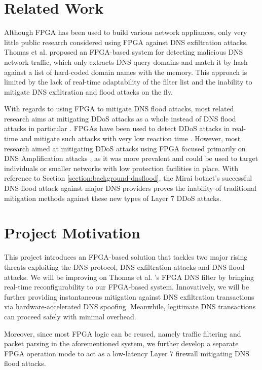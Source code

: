 \documentclass[a4paper]{report}
\begin{document}
\section{Related Work}

Although FPGA has been used to build various network appliances, only very little public research considered using FPGA against DNS exfiltration attacks. Thomas et al. \cite{thomas-2011} proposed an FPGA-based system for detecting malicious DNS network traffic, which only extracts DNS query domains and match it by hash against a list of hard-coded domain names with the memory. This approach is limited by the lack of real-time adaptability of the filter list and the inability to mitigate DNS exfiltration and flood attacks on the fly. 

With regards to using FPGA to mitigate DNS flood attacks, most related research aims at mitigating DDoS attacks as a whole instead of DNS flood attacks in particular \cite{hoque-2017, nagy-2018, tokusashi-2016, thinh-2016}. FPGAs have been used to detect DDoS attacks in real-time \cite{hoque-2017} and mitigate such attacks with very low reaction time \cite{nagy-2018}. However, most research aimed at mitigating DDoS attacks using FPGA focused primarily on DNS Amplification attacks \cite{nagy-2018, thinh-2016, tokusashi-2016}, as it was more prevalent and could be used to target individuals or smaller networks with low protection facilities in place. With reference to Section \ref{section:background-dnsflood}, the Mirai botnet's successful DNS flood attack against major DNS providers proves the inability of traditional mitigation methods against these new types of Layer 7 DDoS attacks. 

\section{Project Motivation}

This project introduces an FPGA-based solution that tackles two major rising threats exploiting the DNS protocol, DNS exfiltration attacks and DNS flood attacks. We will be improving on Thomas et al. \cite{thomas-2011}'s FPGA DNS filter by bringing real-time reconfigurability to our FPGA-based system. Innovatively, we will be further providing instantaneous	mitigation against DNS exfiltration transactions via hardware-accelerated DNS spoofing. Meanwhile, legitimate DNS transactions can proceed safely with minimal overhead.

Moreover, since most FPGA logic can be reused, namely traffic filtering and packet parsing in the aforementioned system, we further develop a separate FPGA operation mode to act as a low-latency Layer 7 firewall mitigating DNS flood attacks.
\end{document}
